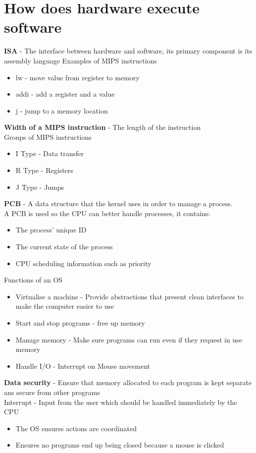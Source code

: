 \documentclass{article}[18pt]
\begin{document}
\section{How does hardware execute software}
\textbf{ISA} - The interface between hardware and software, its primary component is its assembly language
Examples of MIPS instructions
\begin{itemize}
	\item lw - move value from register to memory
	\item addi - add a register and a value
	\item j - jump to a memory location
\end{itemize}
\textbf{Width of a MIPS instruction} - The length of the instruction\\
Groups of MIPS instructions
\begin{itemize}
	\item I Type - Data transfer
	\item R Type - Registers
	\item J Type - Jumps
\end{itemize}
\textbf{PCB} - A data structure that the kernel uses in order to manage a process.\\
A PCB is used so the CPU can better handle processes, it contains:
\begin{itemize}
	\item The process' unique ID
	\item The current state of the process
	\item CPU scheduling information such as priority
\end{itemize}
Functions of an OS
\begin{itemize}
	\item Virtualise a machine - Provide abstractions that present clean interfaces to make the computer easier to use
	\item Start and stop programs - free up memory
	\item Manage memory - Make sure programs can run even if they request in use memory
	\item Handle I/O - Interrupt on Mouse movement
\end{itemize}
\textbf{Data security} - Ensure that memory allocated to each program is kept separate ans secure from other programs\\
Interrupt - Input from the user which should be handled immediately by the CPU
\begin{itemize}
	\item The OS ensures actions are coordinated
	\item Ensures no programs end up being closed because a mouse is clicked
\end{itemize}
\end{document}
